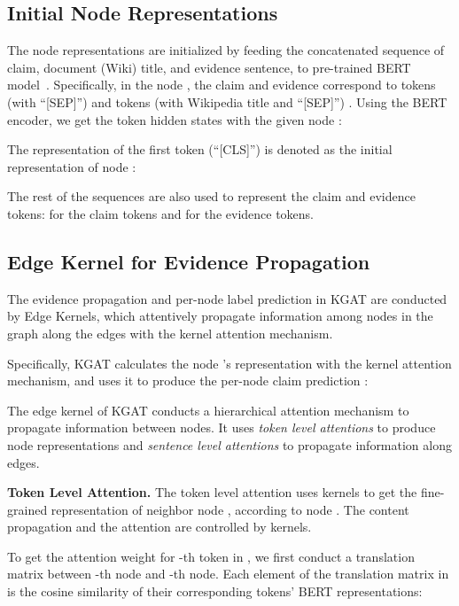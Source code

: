 \documentclass[11pt,a4paper]{article}
\begin{document}
\subsection{Initial Node Representations}\label{model:initial}
The node representations are initialized by feeding the concatenated sequence of claim, document (Wiki) title, and evidence sentence, to pre-trained BERT model~\cite{devlin2019bert}. 
Specifically, in the node , the claim and evidence correspond to  tokens (with ``[SEP]'') and  tokens (with Wikipedia title and ``[SEP]'') . Using the BERT encoder, we get the token hidden states  with the given node :


The representation of the first token (``[CLS]'') is denoted as the initial representation of node :


The rest of the sequences  are also used to represent the claim and evidence tokens:  for the claim tokens and   for the evidence tokens. 



\subsection{Edge Kernel for Evidence Propagation}\label{model:edge_kernel}
The evidence propagation and per-node label prediction in KGAT are conducted by Edge Kernels, which attentively propagate information among nodes in the graph  along the edges with the kernel attention mechanism. 

Specifically, KGAT calculates the node 's representation  with the kernel attention mechanism, and uses it to produce the per-node claim prediction :



The edge kernel of KGAT conducts a hierarchical attention mechanism to propagate information between nodes. It uses \textit{token level attentions} to produce node representations and \textit{sentence level attentions} to propagate information along edges.



\textbf{Token Level Attention.} The token level attention uses kernels to get the fine-grained representation  of neighbor node , according to node . The content propagation and the attention are controlled by kernels.

To get the attention weight  for -th token in ,
we first conduct a translation matrix  between -th node and -th node. Each element of the translation matrix  in  is the cosine similarity of their corresponding tokens' BERT representations:
\end{document}

